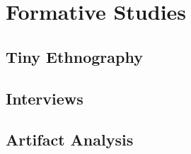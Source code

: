 \chapter{Formative Studies}

\section{Tiny Ethnography}

\section{Interviews}

\section{Artifact Analysis}




